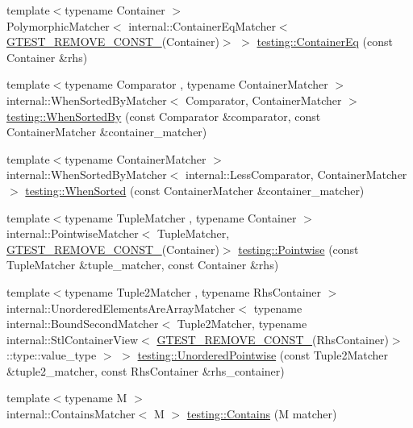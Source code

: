 \begin{DoxyCompactItemize}
\item 
{\footnotesize template$<$typename Container $>$ }\\Polymorphic\+Matcher$<$ internal\+::\+Container\+Eq\+Matcher$<$ \hyperlink{gtest-internal_8h_a2ffec8c60510eb130af387f5ce9a756a}{G\+T\+E\+S\+T\+\_\+\+R\+E\+M\+O\+V\+E\+\_\+\+C\+O\+N\+S\+T\+\_\+}(Container)$>$ $>$ \hyperlink{namespacetesting_a5928ffc4e976a4da981512c422792840}{testing\+::\+Container\+Eq} (const Container \&rhs)
\item 
{\footnotesize template$<$typename Comparator , typename Container\+Matcher $>$ }\\internal\+::\+When\+Sorted\+By\+Matcher$<$ Comparator, Container\+Matcher $>$ \hyperlink{namespacetesting_af74dfcde9ed88d79cf69dfda049078a3}{testing\+::\+When\+Sorted\+By} (const Comparator \&comparator, const Container\+Matcher \&container\+\_\+matcher)
\item 
{\footnotesize template$<$typename Container\+Matcher $>$ }\\internal\+::\+When\+Sorted\+By\+Matcher$<$ internal\+::\+Less\+Comparator, Container\+Matcher $>$ \hyperlink{namespacetesting_a01468e3e641c72a2efb605b4c34675ee}{testing\+::\+When\+Sorted} (const Container\+Matcher \&container\+\_\+matcher)
\item 
{\footnotesize template$<$typename Tuple\+Matcher , typename Container $>$ }\\internal\+::\+Pointwise\+Matcher$<$ Tuple\+Matcher, \hyperlink{gtest-internal_8h_a2ffec8c60510eb130af387f5ce9a756a}{G\+T\+E\+S\+T\+\_\+\+R\+E\+M\+O\+V\+E\+\_\+\+C\+O\+N\+S\+T\+\_\+}(Container)$>$ \hyperlink{namespacetesting_a51ee81f6f1723f7a7aff0429b1d76ec1}{testing\+::\+Pointwise} (const Tuple\+Matcher \&tuple\+\_\+matcher, const Container \&rhs)
\item 
{\footnotesize template$<$typename Tuple2\+Matcher , typename Rhs\+Container $>$ }\\internal\+::\+Unordered\+Elements\+Are\+Array\+Matcher$<$ typename internal\+::\+Bound\+Second\+Matcher$<$ Tuple2\+Matcher, typename internal\+::\+Stl\+Container\+View$<$ \hyperlink{gtest-internal_8h_a2ffec8c60510eb130af387f5ce9a756a}{G\+T\+E\+S\+T\+\_\+\+R\+E\+M\+O\+V\+E\+\_\+\+C\+O\+N\+S\+T\+\_\+}(Rhs\+Container)$>$\+::type\+::value\+\_\+type $>$ $>$ \hyperlink{namespacetesting_a3e800c56ae70a6d9955077a75d4971f1}{testing\+::\+Unordered\+Pointwise} (const Tuple2\+Matcher \&tuple2\+\_\+matcher, const Rhs\+Container \&rhs\+\_\+container)
\item 
{\footnotesize template$<$typename M $>$ }\\internal\+::\+Contains\+Matcher$<$ M $>$ \hyperlink{namespacetesting_a2a12af7db4752797d06c1182b2470933}{testing\+::\+Contains} (M matcher)

\end{DoxyCompactItemize}
